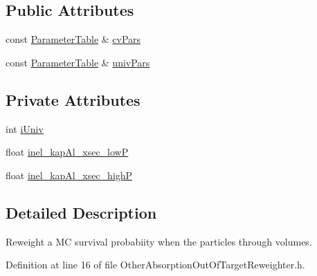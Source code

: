 \subsection*{Public Attributes}
\begin{DoxyCompactItemize}
\item 
const \hyperlink{class_neutrino_flux_reweight_1_1_parameter_table}{Parameter\-Table} \& \hyperlink{class_neutrino_flux_reweight_1_1_other_absorption_out_of_target_reweighter_a1fc316f75f145a3e388f48bbfe458e32}{cv\-Pars}
\item 
const \hyperlink{class_neutrino_flux_reweight_1_1_parameter_table}{Parameter\-Table} \& \hyperlink{class_neutrino_flux_reweight_1_1_other_absorption_out_of_target_reweighter_a02fc32769d87191294df9aaca580f529}{univ\-Pars}
\end{DoxyCompactItemize}
\subsection*{Private Attributes}
\begin{DoxyCompactItemize}
\item 
int \hyperlink{class_neutrino_flux_reweight_1_1_other_absorption_out_of_target_reweighter_aff30780c2efef88d0ef3d929ca8e9ae0}{i\-Univ}
\item 
float \hyperlink{class_neutrino_flux_reweight_1_1_other_absorption_out_of_target_reweighter_a1fa8ca53fe660fcc66886eb55d9db296}{inel\-\_\-kap\-Al\-\_\-xsec\-\_\-low\-P}
\item 
float \hyperlink{class_neutrino_flux_reweight_1_1_other_absorption_out_of_target_reweighter_a7fd78bf2576386f2854cca235f000e2a}{inel\-\_\-kap\-Al\-\_\-xsec\-\_\-high\-P}
\end{DoxyCompactItemize}


\subsection{Detailed Description}
Reweight a M\-C survival probabiity when the particles through volumes. 

Definition at line 16 of file Other\-Absorption\-Out\-Of\-Target\-Reweighter.\-h.



